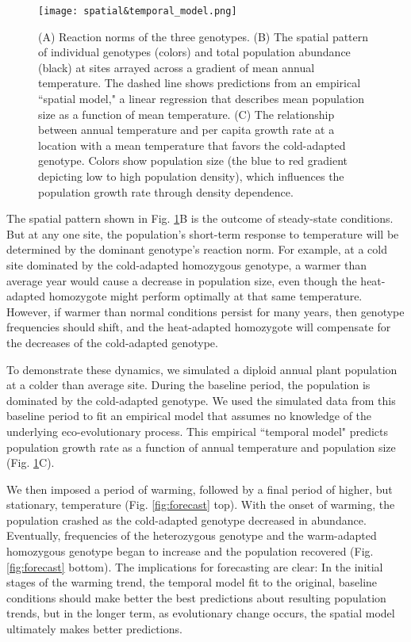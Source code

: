 \documentclass[11pt]{article}
\begin{document}
\begin{figure}[tbp]
\centering
\texttt{[image: spatial\&temporal\_model.png]}
\caption{(A) Reaction norms of the three genotypes. (B) The spatial pattern of individual genotypes (colors) and total population abundance (black) at sites arrayed across a gradient of mean annual temperature. The dashed line shows predictions from an empirical ``spatial model," a linear regression that describes mean population size as a function of mean temperature. (C) The relationship between annual temperature and per capita growth rate at a location with a mean temperature that favors the cold-adapted genotype. Colors show population size (the blue to red gradient depicting low to high population density), which influences the population growth rate through density dependence. }
\label{fig:evo_evo_spatial_temporal_models}
\end{figure}

The spatial pattern shown in Fig. \ref{fig:evo_evo_spatial_temporal_models}B is the outcome of steady-state conditions. But at any one site, the population's short-term response to temperature will be determined by the dominant genotype's reaction norm. For example, at a cold site dominated by the cold-adapted homozygous genotype, a warmer than average year would cause a decrease in population size, even though the heat-adapted homozygote might perform optimally at that same temperature. However, if warmer than normal conditions persist for many years, then genotype frequencies should shift, and the heat-adapted homozygote will compensate for the decreases of the cold-adapted genotype. 

To demonstrate these dynamics, we simulated a diploid annual plant population at a colder than average site. During the baseline period, the population is dominated by the cold-adapted genotype. We used the simulated data from this baseline period to fit an empirical model that assumes no knowledge of the underlying eco-evolutionary process. This empirical ``temporal model" predicts population growth rate as a function of annual temperature and population size (Fig. \ref{fig:evo_evo_spatial_temporal_models}C). 

We then imposed a period of warming, followed by a final period of higher, but stationary, temperature (Fig. \ref{fig:forecast} top). With the onset of warming, the population crashed as the cold-adapted genotype decreased in abundance. Eventually, frequencies of the heterozygous genotype and the warm-adapted homozygous genotype began to increase and the population recovered (Fig. \ref{fig:forecast} bottom). The implications for forecasting are clear: In the initial stages of the warming trend, the temporal model fit to the original, baseline conditions should make better the best predictions about resulting population trends, but in the longer term, as evolutionary change occurs, the spatial model ultimately makes better predictions. 
\end{document}
